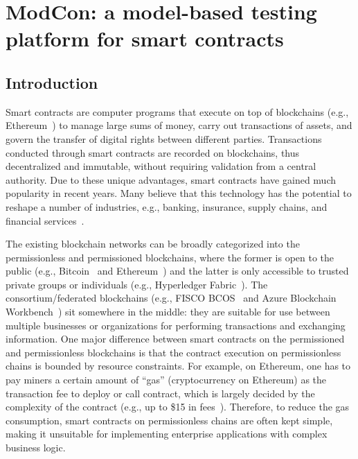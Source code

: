 
\chapter{ModCon: a model-based testing platform for smart contracts} %
\label{ch:modcon} %



\section{Introduction}
\label{sec:intro}

Smart contracts are computer programs that execute on top of blockchains (e.g.,
Ethereum~\cite{Ethereum}) to manage large sums of money, carry out transactions of assets, and
govern the transfer of digital rights between different parties.
Transactions conducted through smart contracts are recorded on blockchains, thus decentralized and
immutable, without requiring validation from a central authority.
Due to these unique advantages, smart contracts have gained much popularity in recent years.
Many believe that this technology has the potential to reshape a number of industries,
e.g., banking, insurance, supply chains, and financial services~\cite{iansiti2017truth}.

The existing blockchain networks can be broadly categorized into the permissionless and
permissioned blockchains, where the former is open to the public (e.g.,
Bitcoin~\cite{nakamoto2008bitcoin} and Ethereum~\cite{Ethereum}) and the latter is only accessible
to trusted private groups or individuals (e.g., Hyperledger Fabric~\cite{hyperledger-fabric}).
The consortium/federated blockchains (e.g., FISCO BCOS~\cite{fisco} and Azure Blockchain
Workbench~\cite{azure-workbench}) sit somewhere in the middle: they are suitable for use between
multiple businesses or organizations for performing  transactions and exchanging information.
One major difference between smart contracts on the permissioned and permissionless blockchains is that the
contract execution on permissionless chains is bounded by resource constraints.
For example, on Ethereum, one has to pay miners a certain amount of ``gas'' (cryptocurrency on Ethereum) as the transaction fee to deploy or call contract, which is largely decided by the complexity of the contract (e.g., up to \$15 in fees~\cite{gas-fee}).
Therefore, to reduce the gas consumption, smart contracts on permissionless chains are often kept simple, making it
unsuitable for implementing enterprise applications with complex business logic.

